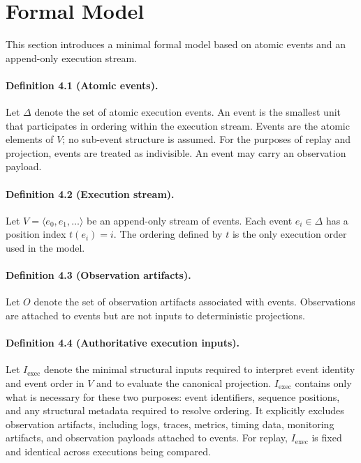 \section{Formal Model}

This section introduces a minimal formal model based on atomic events and an append-only execution stream.

\paragraph{Definition 4.1 (Atomic events).}
Let $\Delta$ denote the set of atomic execution events. An event is the smallest unit that participates in ordering within the execution stream. Events are the atomic elements of $V$; no sub-event structure is assumed. For the purposes of replay and projection, events are treated as indivisible. An event may carry an observation payload.

\paragraph{Definition 4.2 (Execution stream).}
Let $V = \langle e_0, e_1, \ldots \rangle$ be an append-only stream of events. Each event $e_i \in \Delta$ has a position index $t(e_i) = i$. The ordering defined by $t$ is the only execution order used in the model.

\paragraph{Definition 4.3 (Observation artifacts).}
Let $O$ denote the set of observation artifacts associated with events. Observations are attached to events but are not inputs to deterministic projections.

\paragraph{Definition 4.4 (Authoritative execution inputs).}
Let $I_{\text{exec}}$ denote the minimal structural inputs required to interpret event identity and event order in $V$ and to evaluate the canonical projection. $I_{\text{exec}}$ contains only what is necessary for these two purposes: event identifiers, sequence positions, and any structural metadata required to resolve ordering. It explicitly excludes observation artifacts, including logs, traces, metrics, timing data, monitoring artifacts, and observation payloads attached to events. For replay, $I_{\text{exec}}$ is fixed and identical across executions being compared.

